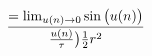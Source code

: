 \documentclass[preview]{standalone}
\begin{document}
\begin{align*}
= \lim_{u(n) \to 0} \sin \big( u(n)\big) \over {\frac {u(n)}{\tau} }\big) \frac {1} {2} r^2
\end{align*}
\end{document}
